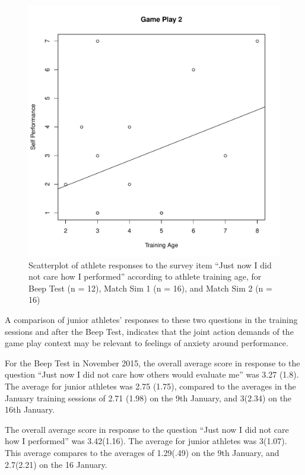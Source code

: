 \begin{CJK}{UTF8}{gbsn}
\begin{figure}[htbp]
\includegraphics[scale=.2]{images/indPerf0116TrainingAge.pdf}
  \caption{Scatterplot of athlete responses to the survey item ``Just now I did not care how I performed'' according to athlete training age, for Beep Test (n = 12), Match Sim 1 (n = 16), and Match Sim 2 (n = 16)}
  \label{fig:indPerfPostTraining}
\end{figure}



A comparison of junior athletes' responses to these two questions in the training sessions and after the Beep Test, indicates that the joint action demands of the game play context may be relevant to feelings of anxiety around performance.

For the Beep Test in November 2015, the overall average score in response to the question ``Just now I did not care how others would evaluate me'' was 3.27 (1.8).  The average for junior athletes was 2.75 (1.75), compared to the averages in the January training sessions of 2.71 (1.98) on the 9th January, and 3(2.34) on the 16th January.

The overall average score in response to the question ``Just now I did not care how I performed'' was 3.42(1.16).  The average for junior athletes was 3(1.07).  This average compares to the averages of 1.29(.49) on the 9th January, and 2.7(2.21) on the 16 January.


\end{CJK}
